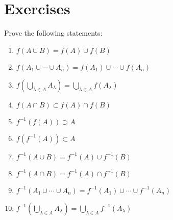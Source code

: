 \section*{Exercises}
\begin{prbm}
Prove the following statements:
\begin{enumerate}[label=(\roman*)]
\item $f(A\cup B)=f(A)\cup f(B)$
\item $f(A_1\cup\cdots\cup A_n)=f(A_1)\cup\cdots\cup f(A_n)$
\item $f(\bigcup_{\lambda\in A}A_\lambda)=\bigcup_{\lambda\in A}f(A_\lambda)$
\item $f(A\cap B)\subset f(A)\cap f(B)$
\item $f^{-1}(f(A))\supset A$
\item $f(f^{-1}(A))\subset A$
\item $f^{-1}(A\cup B)=f^{-1}(A)\cup f^{-1}(B)$
\item $f^{-1}(A\cap B)=f^{-1}(A)\cap f^{-1}(B)$
\item $f^{-1}(A_1\cup\cdots\cup A_n)=f^{-1}(A_1)\cup\cdots\cup f^{-1}(A_n)$
\item $f^{-1}(\bigcup_{\lambda\in A}A_\lambda)=\bigcup_{\lambda\in A}f^{-1}(A_\lambda)$
\end{enumerate}
\end{prbm}

